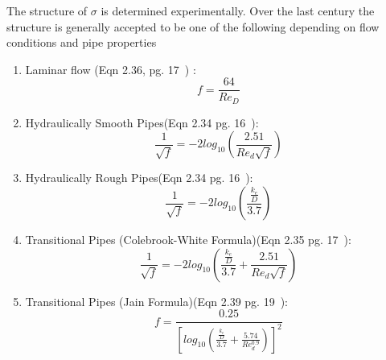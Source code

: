 The structure of $\sigma$ is determined experimentally.  Over the last century the structure is generally accepted to be one of the following depending on flow conditions and pipe properties
\begin{enumerate}
\item Laminar flow (Eqn 2.36, pg. 17~\cite{chin2006}) :  
\begin{equation}
f=\frac{64}{Re_D}
\label{eqn:friction-factor-laminar}
\end{equation}
\item Hydraulically Smooth Pipes(Eqn 2.34 pg. 16~\cite{chin2006}):
\begin{equation}
\frac{1}{\sqrt{f}}=-2 log_{10} (\frac{2.51}{Re_d \sqrt{f} })
\label{eqn:friction-factor-smooth}
\end{equation}
\item Hydraulically Rough Pipes(Eqn 2.34 pg. 16~\cite{chin2006}):
\begin{equation}
\frac{1}{\sqrt{f}}=-2 log_{10} (\frac{\frac{k_e}{D}} {3.7})
\label{eqn:friction-factor-rough}
\end{equation}
\item Transitional Pipes (Colebrook-White Formula)(Eqn 2.35 pg. 17~\cite{chin2006}):
\begin{equation}
\frac{1}{\sqrt{f}}=-2 log_{10} (\frac{\frac{k_e}{D}} {3.7} + \frac{2.51}{Re_d \sqrt{f} } )
\label{eqn:friction-factor-CW}
\end{equation}
\item Transitional Pipes (Jain Formula)(Eqn 2.39 pg. 19~\cite{chin2006}):
\begin{equation}
f=\frac{0.25}{[log_{10} (\frac{\frac{k_e}{D}} {3.7} + \frac{5.74}{Re_d^{0.9} } )]  ^2}
\label{eqn:friction-factor-Jain}
\end{equation}
\end{enumerate} 



